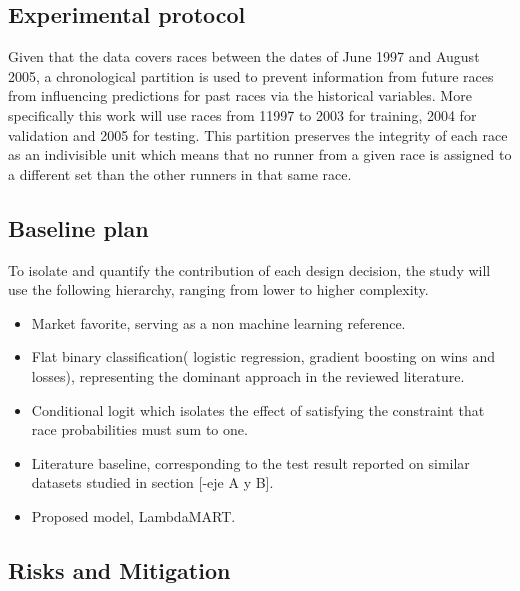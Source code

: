 \subsection{Experimental protocol}
Given that the data covers races between the dates of June 1997 and August 2005, a chronological partition is used to prevent information from future races from influencing predictions for past races via the historical variables. More specifically this work will use races from 11997 to 2003 for training, 2004 for validation and 2005 for testing. This partition preserves the integrity of each race as an indivisible unit which means that no runner from a given race is assigned to a different set than the other runners in that same race. 

\subsection{Baseline plan}
To isolate and quantify the contribution of each design decision, the study will use the following hierarchy, ranging from lower to higher complexity.

\begin{itemize}
    \item Market favorite, serving as a non machine learning reference.
    \item Flat binary classification( logistic regression, gradient boosting on wins and losses), representing the dominant approach in the reviewed literature.
    \item Conditional logit which isolates the effect of satisfying the constraint that race probabilities must sum to one.
    \item Literature baseline, corresponding to the test result reported on similar datasets studied in section [-eje A y B].
    \item Proposed model, LambdaMART.
\end{itemize}

\subsection{Risks and Mitigation}

\label{sec:risks}
 
